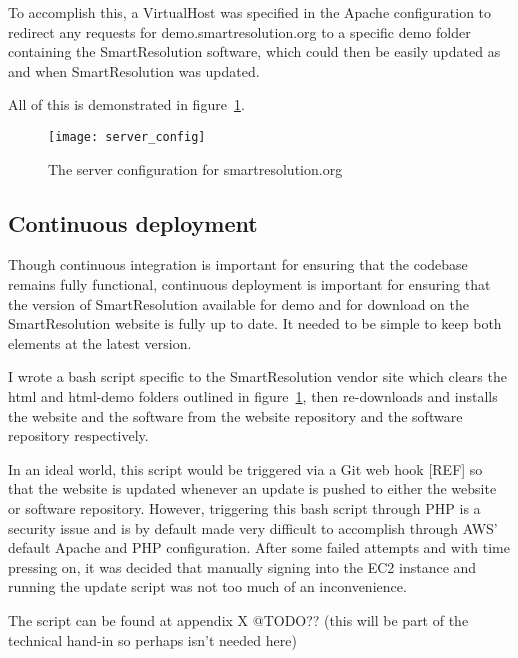 To accomplish this, a VirtualHost was specified in the Apache configuration to redirect any requests for demo.smartresolution.org to a specific demo folder containing the SmartResolution software, which could then be easily updated as and when SmartResolution was updated.

All of this is demonstrated in figure~\ref{uml:serverConfig}.

\begin{figure}[h!]
  \centering
    \ifimages
    \texttt{[image: server\_config]}
    \fi
  \caption{The server configuration for smartresolution.org}
  \label{uml:serverConfig}
\end{figure}

\subsection{Continuous deployment}

Though continuous integration is important for ensuring that the codebase remains fully functional, continuous deployment is important for ensuring that the version of SmartResolution available for demo and for download on the SmartResolution website is fully up to date. It needed to be simple to keep both elements at the latest version.

I wrote a bash script specific to the SmartResolution vendor site which clears the html and html-demo folders outlined in figure~\ref{uml:serverConfig}, then re-downloads and installs the website and the software from the website repository and the software repository respectively.

In an ideal world, this script would be triggered via a Git web hook [REF] so that the website is updated whenever an update is pushed to either the website or software repository. However, triggering this bash script through PHP is a security issue and is by default made very difficult to accomplish through AWS' default Apache and PHP configuration. After some failed attempts and with time pressing on, it was decided that manually signing into the EC2 instance and running the update script was not too much of an inconvenience.

The script can be found at appendix X @TODO?? (this will be part of the technical hand-in so perhaps isn't needed here)